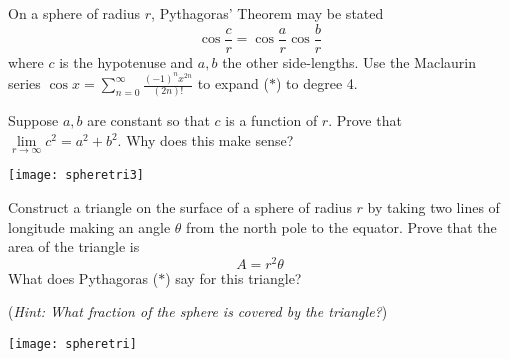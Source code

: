 \begin{exercises}{}{}
\begin{enumerate}
	  
		\begin{minipage}[t]{0.7\linewidth}\vspace{0pt}
			\item On a sphere of radius $r$, Pythagoras' Theorem may be stated
			\[
				\cos\frac cr=\cos\frac ar\cos\frac br \tag{$\ast$}
			\]
			where $c$ is the hypotenuse and $a,b$ the other side-lengths. Use the Maclaurin series $\cos x=\sum\limits_{n=0}^\infty\frac{(-1)^nx^{2n}}{(2n)!}$ to expand ($\ast$) to degree 4.\par
			Suppose $a,b$ are constant so that $c$ is a function of $r$. Prove that $\displaystyle\lim\limits_{r\to\infty}c^2=a^2+b^2$. Why does this make sense?
		\end{minipage}
		\hfill
		\begin{minipage}[t]{0.29\linewidth}\vspace{0pt}
		  \hfill\texttt{[image: spheretri3]}
		\end{minipage}
  
  
  	\begin{minipage}[t]{0.7\linewidth}\vspace{0pt}
  		\item Construct a triangle on the surface of a sphere of radius $r$ by taking two lines of longitude making an angle $\theta$ from the north pole to the equator. Prove that the area of the triangle is
  		\[
  			A=r^2\theta
  		\]
  		What does Pythagoras ($\ast$) say for this triangle?\par
  		(\emph{Hint: What fraction of the sphere is covered by the triangle?})
  	\end{minipage}
  	\hfill
  	\begin{minipage}[t]{0.29\linewidth}\vspace{0pt}
  		\hfill\texttt{[image: spheretri]}
  	\end{minipage}
	  
	\end{enumerate}
\end{exercises}